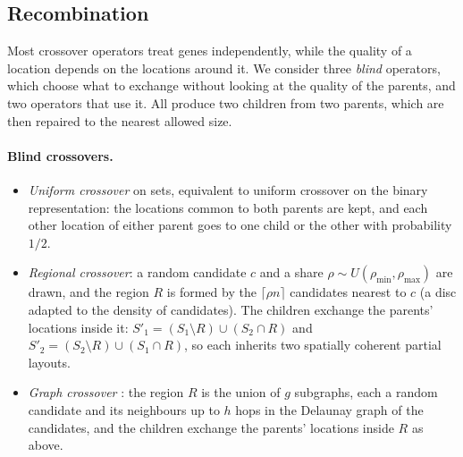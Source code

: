 \subsection{Recombination}
\label{sec:crossovers}
Most crossover operators treat genes independently, while the quality of a location depends on the locations around it. We consider three \emph{blind} operators, which choose what to exchange without looking at the quality of the parents, and two operators that use it. All produce two children from two parents, which are then repaired to the nearest allowed size.

\paragraph{Blind crossovers.}
\begin{itemize}
\item \emph{Uniform crossover} on sets, equivalent to uniform crossover on the binary representation: the locations common to both parents are kept, and each other location of either parent goes to one child or the other with probability $1/2$.
\item \emph{Regional crossover}: a random candidate $c$ and a share $\rho \sim U(\rho_{\min}, \rho_{\max})$ are drawn, and the region $R$ is formed by the $\lceil \rho n \rceil$ candidates nearest to $c$ (a disc adapted to the density of candidates). The children exchange the parents' locations inside it: $S'_1 = (S_1 \setminus R) \cup (S_2 \cap R)$ and $S'_2 = (S_2 \setminus R) \cup (S_1 \cap R)$, so each inherits two spatially coherent partial layouts.
\item \emph{Graph crossover} \cite{jordan2025crossover}: the region $R$ is the union of $g$ subgraphs, each a random candidate and its neighbours up to $h$ hops in the Delaunay graph of the candidates, and the children exchange the parents' locations inside $R$ as above.
\end{itemize}

